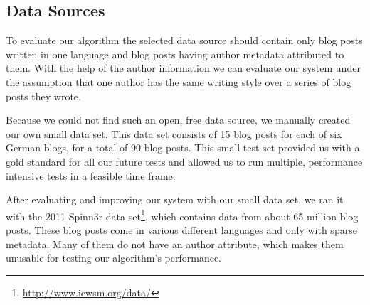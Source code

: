 
\subsection{Data Sources}
\label{sec:data_sources}


To evaluate our algorithm the selected data source should contain only blog posts written in one language and blog posts having author metadata attributed to them.
With the help of the author information we can evaluate our system under the assumption that one author has the same writing style over a series of blog posts they wrote.

Because we could not find such an open, free data source, we manually created our own small data set.
This data set consists of 15 blog posts for each of six German blogs, for a total of 90 blog posts.
This small test set provided us with a gold standard for all our future tests and allowed us to run multiple, performance intensive tests in a feasible time frame.

After evaluating and improving our system with our small data set, we ran it with the 2011 Spinn3r data set\footnote{\url{http://www.icwsm.org/data/}}, which contains data from about 65 million blog posts.
These blog posts come in various different languages and only with sparse metadata.
Many of them do not have an author attribute, which makes them unusable for testing our algorithm's performance.


